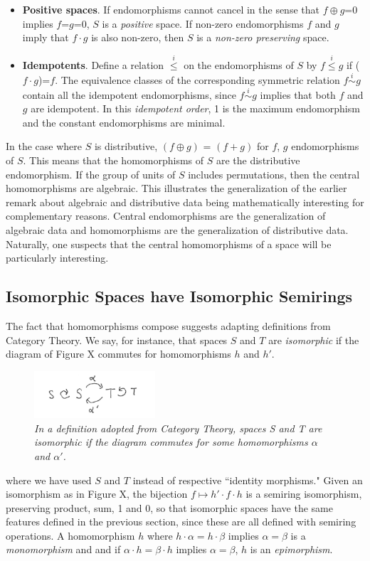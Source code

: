 \documentclass[11pt]{article}
\begin{document}
\begin{itemize}
\item{{\bf Positive spaces}.  If endomorphisms cannot cancel in the sense that $f\oplus g$=0 implies $f$=$g$=0, $S$ is a {\it positive} space.  If  
non-zero endomorphisms $f$ and $g$ imply that $f\cdot g$ is also non-zero, then $S$ is a {\it non-zero preserving} space.} 

\item{{\bf Idempotents}.  Define a relation ${\overset i \leq}$ on the endomorphisms of $S$ by $f{\overset i \leq}g$ if ($f\cdot g$)=$f$.  The equivalence 
classes of the corresponding symmetric relation $f{\overset i \sim} g$ contain all the idempotent endomorphisms, since $f{\overset i\sim}g$ implies that 
both $f$ and $g$ are idempotent.  In this {\it idempotent order}, 1 is the maximum endomorphism and the constant endomorphisms are minimal.}

\end{itemize} 
In the case where $S$ is distributive, $(f\oplus g)$ = $(f+g)$ for $f$, $g$ endomorphisms of $S$.  This means that the homomorphisms of $S$ are 
the distributive endomorphism.  If the group of units of $S$ includes permutations, then the central homomorphisms are algebraic.  This illustrates 
the generalization of the earlier remark about algebraic and distributive data being mathematically interesting for complementary reasons.  Central 
endomorphisms are the generalization of algebraic data and homomorphisms are the generalization of distributive data.  Naturally, one suspects 
that the central homomorphisms of a space will be particularly interesting. 

\subsection{Isomorphic Spaces have Isomorphic Semirings} 

The fact that homomorphisms compose suggests adapting definitions from Category Theory.  
We say, for instance, that spaces $S$ and $T$ are {\it isomorphic} if the diagram of Figure X commutes for homomorphisms 
$h$ and $h'$.  
\begin{figure}[h]
\centering
\includegraphics[width=0.4\textwidth]{isomorphism.png}
\caption{{\it In a definition adopted from Category Theory, spaces S and T are isomorphic if the diagram commutes for some homomorphisms $\alpha$ and $\alpha'$.}}
\end{figure}
where we have used $S$ and $T$ instead of respective ``identity morphisms."  Given an isomorphism as in Figure X, the bijection $f\mapsto h'\cdot f \cdot h$ is 
a semiring isomorphism, preserving product, sum, 1 and 0, so that isomorphic spaces have the same features defined in the previous section, since 
these are all defined with semiring operations.  A homomorphism $h$ where $h\cdot \alpha=h\cdot \beta$ implies $\alpha=\beta$ is a {\it monomorphism} and 
and if $\alpha\cdot h=\beta\cdot h$ implies $\alpha=\beta$, $h$ is an {\it epimorphism}.  
\end{document}
